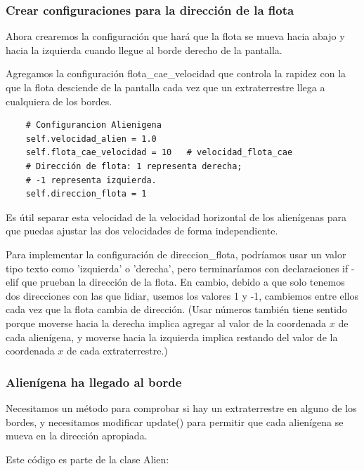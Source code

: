 \subsubsection{Crear configuraciones para la dirección de la flota}
Ahora crearemos la configuración que hará que la flota se mueva hacia abajo y hacia la izquierda cuando llegue al borde derecho de la pantalla. 


Agregamos la configuración {\ttfamily flota\_cae\_velocidad} que controla la rapidez con la que la flota desciende de la pantalla cada vez que un extraterrestre llega a cualquiera de los bordes. 

\hspace{-2.5cm}{\ttfamily \scriptsize alien.py}  \vspace{-0.5cm}
\begin{lstlisting}        
    # Configurancion Alienigena
    self.velocidad_alien = 1.0 
    self.flota_cae_velocidad = 10   # velocidad_flota_cae
    # Dirección de flota: 1 representa derecha;
    # -1 representa izquierda.
    self.direccion_flota = 1  
\end{lstlisting}

Es útil separar esta velocidad de la velocidad horizontal de los alienígenas para que puedas ajustar las dos velocidades de forma independiente.

Para implementar la configuración de {\ttfamily direccion\_flota}, podríamos usar un valor tipo texto como 'izquierda' o 'derecha',
pero terminaríamos con declaraciones {\ttfamily if - elif} que prueban la dirección de la flota. 
En cambio, debido a que solo tenemos  dos direcciones con las que lidiar, usemos los valores 1 y -1,  cambiemos entre ellos cada vez que la flota cambia de dirección. 
(Usar números también tiene sentido porque moverse hacia la derecha implica agregar al valor de la coordenada $x$ de cada alienígena, y moverse hacia la izquierda implica restando del valor de la coordenada $x$ de cada extraterrestre.)

\subsubsection{Alienígena ha llegado al borde}

Necesitamos un método para comprobar si hay un extraterrestre en alguno de los bordes, y necesitamos
modificar  {\ttfamily update()} para permitir que cada alienígena se mueva en la dirección apropiada.

Este código es parte de la clase {\ttfamily Alien}:



